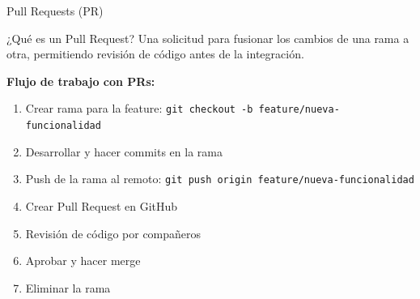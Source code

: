 \documentclass[aspectratio=169]{beamer}
\begin{document}
\begin{frame}{Pull Requests (PR)}
    \begin{block}{¿Qué es un Pull Request?}
        Una solicitud para fusionar los cambios de una rama a otra, permitiendo revisión de código antes de la integración.
    \end{block}
    
    \vspace{0.3cm}
    \textbf{Flujo de trabajo con PRs:}
    \begin{enumerate}
        \item Crear rama para la feature: \texttt{git checkout -b feature/nueva-funcionalidad}
        \item Desarrollar y hacer commits en la rama
        \item Push de la rama al remoto: \texttt{git push origin feature/nueva-funcionalidad}
        \item Crear Pull Request en GitHub
        \item Revisión de código por compañeros
        \item Aprobar y hacer merge
        \item Eliminar la rama
    \end{enumerate}
\end{frame}
\end{document}
